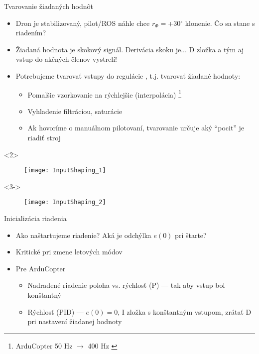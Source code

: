 
\begin{frame}[t]{Tvarovanie žiadaných hodnôt}
  \begin{itemize}
  \item<1-> Dron je stabilizovaný, pilot/ROS náhle chce $r_{\Phi}=$+30$^\circ$ klonenie. Čo sa stane s riadením?
  \item<2->  Žiadaná hodnota je skokový signál. Derivácia skoku je... D zložka a tým aj vstup do akčných členov vystrelí!
  \item<3->  Potrebujeme tvarovať vstupy do regulácie , t.j. tvarovať žiadané hodnoty:
        \begin{itemize}
  \item Pomalšie vzorkovanie na rýchlejšie (interpolácia) \footnote{ArduCopter 50 Hz $\rightarrow$ 400 Hz \citep{AP:PID}}
  \item Vyhladenie filtráciou, saturácie
  \item<4-> Ak hovoríme o manuálnom pilotovaní, tvarovanie určuje aký ``pocit'' je riadiť stroj
  \end{itemize}
  \end{itemize}

        \begin{onlyenv}<2>
  \begin{figure}
\centering
  \texttt{[image: InputShaping\_1]}\\
\end{figure}
\end{onlyenv}


        \begin{onlyenv}<3->
  \begin{figure}
\centering
  \texttt{[image: InputShaping\_2]}\\
\end{figure}
\end{onlyenv}

\end{frame}

\begin{frame}[t]{Inicializácia riadenia}
\begin{itemize}
  \item<1-> Ako naštartujeme riadenie? Aká je odchýlka $e(0)$ pri štarte?
  \item<2-> Kritické pri zmene letových módov \citep{AP:PID,Bresciani2020}
  \item<3-> Pre ArduCopter \cite{AP:PID}
    \begin{itemize}
    \item Nadradené riadenie poloha vs. rýchlosť (P) --- tak aby vstup bol konštantný
    \item Rýchlosť (PID) --- $e(0)=0$, I zložka s konštantným vstupom, zrátať D pri nastavení žiadanej hodnoty
\end{itemize}

\end{itemize}
\end{frame} 